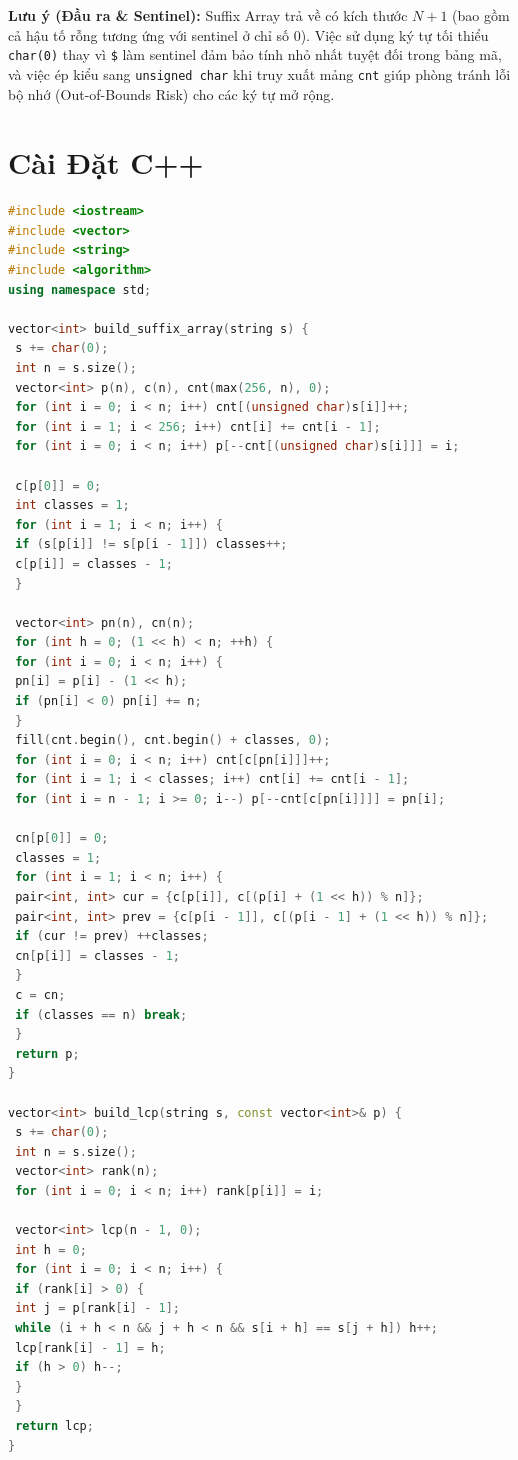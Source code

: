 \documentclass[11pt, letterpaper]{report}
\begin{document}
\textbf{Lưu ý (Đầu ra \& Sentinel):} Suffix Array trả về có kích thước $N+1$ (bao gồm cả hậu tố rỗng tương ứng với sentinel ở chỉ số $0$). Việc sử dụng ký tự tối thiểu \texttt{char(0)} thay vì \texttt{\$} làm sentinel đảm bảo tính nhỏ nhất tuyệt đối trong bảng mã, và việc ép kiểu sang \texttt{unsigned char} khi truy xuất mảng \texttt{cnt} giúp phòng tránh lỗi bộ nhớ (Out-of-Bounds Risk) cho các ký tự mở rộng.

\section{Cài Đặt C++}
\begin{lstlisting}[language=C++, caption={C++ Suffix Array \& Kasai's LCP Engine}]
#include <iostream>
#include <vector>
#include <string>
#include <algorithm>
using namespace std;

vector<int> build_suffix_array(string s) {
 s += char(0);
 int n = s.size();
 vector<int> p(n), c(n), cnt(max(256, n), 0);
 for (int i = 0; i < n; i++) cnt[(unsigned char)s[i]]++;
 for (int i = 1; i < 256; i++) cnt[i] += cnt[i - 1];
 for (int i = 0; i < n; i++) p[--cnt[(unsigned char)s[i]]] = i;
 
 c[p[0]] = 0;
 int classes = 1;
 for (int i = 1; i < n; i++) {
 if (s[p[i]] != s[p[i - 1]]) classes++;
 c[p[i]] = classes - 1;
 }
 
 vector<int> pn(n), cn(n);
 for (int h = 0; (1 << h) < n; ++h) {
 for (int i = 0; i < n; i++) {
 pn[i] = p[i] - (1 << h);
 if (pn[i] < 0) pn[i] += n;
 }
 fill(cnt.begin(), cnt.begin() + classes, 0);
 for (int i = 0; i < n; i++) cnt[c[pn[i]]]++;
 for (int i = 1; i < classes; i++) cnt[i] += cnt[i - 1];
 for (int i = n - 1; i >= 0; i--) p[--cnt[c[pn[i]]]] = pn[i];
 
 cn[p[0]] = 0;
 classes = 1;
 for (int i = 1; i < n; i++) {
 pair<int, int> cur = {c[p[i]], c[(p[i] + (1 << h)) % n]};
 pair<int, int> prev = {c[p[i - 1]], c[(p[i - 1] + (1 << h)) % n]};
 if (cur != prev) ++classes;
 cn[p[i]] = classes - 1;
 }
 c = cn;
 if (classes == n) break;
 }
 return p;
}

vector<int> build_lcp(string s, const vector<int>& p) {
 s += char(0);
 int n = s.size();
 vector<int> rank(n);
 for (int i = 0; i < n; i++) rank[p[i]] = i;
 
 vector<int> lcp(n - 1, 0);
 int h = 0;
 for (int i = 0; i < n; i++) {
 if (rank[i] > 0) {
 int j = p[rank[i] - 1];
 while (i + h < n && j + h < n && s[i + h] == s[j + h]) h++;
 lcp[rank[i] - 1] = h;
 if (h > 0) h--;
 }
 }
 return lcp;
}
\end{lstlisting}
\end{document}
